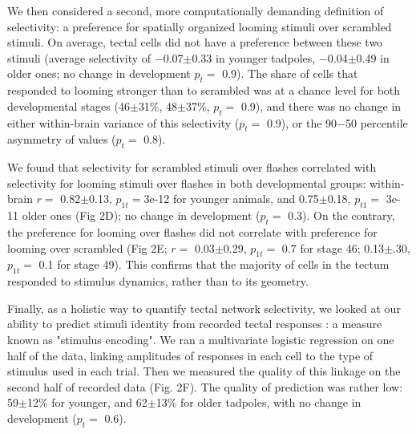 \documentclass{article}
\begin{document}
We then considered a second, more computationally demanding definition of selectivity: a preference for spatially organized looming stimuli over scrambled stimuli. On average, tectal cells did not have a preference between these two stimuli (average selectivity of $-$0.07$\pm$0.33 in younger tadpoles, $-$0.04$\pm$0.49 in older ones; no change in development $p_t=$ 0.9). The share of cells that responded to looming stronger than to scrambled was at a chance level for both developmental stages (46$\pm$31\%, 48$\pm$37\%, $p_t=$ 0.9), and there was no change in either within-brain variance of this selectivity ($p_t=$ 0.9), or the 90$-$50 percentile asymmetry of values ($p_t=$ 0.8).

We found that selectivity for scrambled stimuli over flashes correlated with selectivity for looming stimuli over flashes in both developmental groups: within-brain $r=$ 0.82$\pm$0.13, $p_{1t}=$3e-12 for younger animals, and 0.75$\pm$0.18, $p_{t1}=$ 3e-11 older ones (Fig 2D); no change in development ($p_t=$ 0.3). On the contrary, the preference for looming over flashes did not correlate with preference for looming over scrambled (Fig 2E; $r=$ 0.03$\pm$0.29, $p_{1t}=$ 0.7 for stage 46; 0.13$\pm$.30, $p_{1t}=$ 0.1 for stage 49). This confirms that the majority of cells in the tectum responded to stimulus dynamics, rather than to its geometry.

Finally, as a holistic way to quantify tectal network selectivity, we looked at our ability to predict stimuli identity from recorded tectal responses \citep{avitan2016limitations}: a measure known as "stimulus encoding". We ran a multivariate logistic regression on one half of the data, linking amplitudes of responses in each cell to the type of stimulus used in each trial. Then we measured the quality of this linkage on the second half of recorded data (Fig. 2F). The quality of prediction was rather low: 59$\pm$12\% for younger, and 62$\pm$13\% for older tadpoles, with no change in development ($p_t=$ 0.6).
\end{document}
